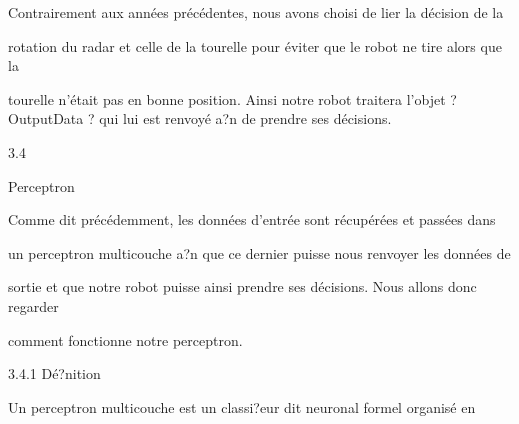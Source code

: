 \documentclass[a4paper,portrait,12pt]{article}
\begin{document}
\begin{flushleft}
Contrairement aux ann\'{e}es pr\'{e}c\'{e}dentes, nous avons choisi de lier la d\'{e}cision de la
\end{flushleft}


\begin{flushleft}
rotation du radar et celle de la tourelle pour \'{e}viter que le robot ne tire alors que la
\end{flushleft}


\begin{flushleft}
tourelle n'\'{e}tait pas en bonne position. Ainsi notre robot traitera l'objet ? OutputData ? qui lui est renvoy\'{e} a?n de prendre ses d\'{e}cisions.
\end{flushleft}


3.4





\begin{flushleft}
Perceptron
\end{flushleft}





\begin{flushleft}
Comme dit pr\'{e}c\'{e}demment, les donn\'{e}es d'entr\'{e}e sont r\'{e}cup\'{e}r\'{e}es et pass\'{e}es dans
\end{flushleft}


\begin{flushleft}
un perceptron multicouche a?n que ce dernier puisse nous renvoyer les donn\'{e}es de
\end{flushleft}


\begin{flushleft}
sortie et que notre robot puisse ainsi prendre ses d\'{e}cisions. Nous allons donc regarder
\end{flushleft}


\begin{flushleft}
comment fonctionne notre perceptron.
\end{flushleft}





\begin{flushleft}
3.4.1 D\'{e}?nition
\end{flushleft}


\begin{flushleft}
Un perceptron multicouche est un classi?eur dit neuronal formel organis\'{e} en
\end{flushleft}
\end{document}

